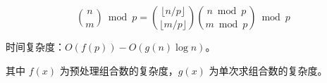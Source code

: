 $$
\binom{n}{m}\bmod{p} = \binom{\lfloor n/p\rfloor}{\lfloor m/p\rfloor}\binom{n \bmod p}{m \bmod p}\bmod p
$$

时间复杂度：$O(f(p))-O(g(n)\log n)$。

其中 $f(x)$ 为预处理组合数的复杂度，$g(x)$ 为单次求组合数的复杂度。